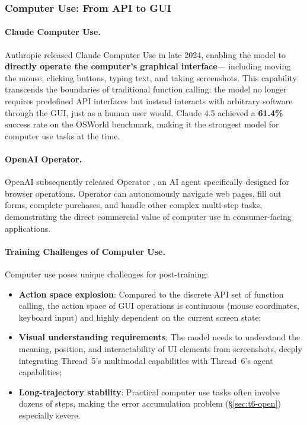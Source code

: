 \subsubsection{Computer Use: From API to GUI}

\paragraph{Claude Computer Use.}
Anthropic released Claude Computer Use \cite{anthropic2024computeruse} in late 2024,
enabling the model to \textbf{directly operate the computer's graphical interface}---
including moving the mouse, clicking buttons, typing text, and taking screenshots.
This capability transcends the boundaries of traditional function calling:
the model no longer requires predefined API interfaces
but instead interacts with arbitrary software through the GUI, just as a human user would.
Claude 4.5 \cite{anthropic2025claude45} achieved a \textbf{61.4\%} success rate on the OSWorld benchmark,
making it the strongest model for computer use tasks at the time.

\paragraph{OpenAI Operator.}
OpenAI subsequently released Operator \cite{openai2025operator},
an AI agent specifically designed for browser operations.
Operator can autonomously navigate web pages, fill out forms, complete purchases, and handle other complex multi-step tasks,
demonstrating the direct commercial value of computer use in consumer-facing applications.

\paragraph{Training Challenges of Computer Use.}
Computer use poses unique challenges for post-training:
\begin{itemize}[leftmargin=2em]
  \item \textbf{Action space explosion}: Compared to the discrete API set of function calling,
    the action space of GUI operations is continuous (mouse coordinates, keyboard input)
    and highly dependent on the current screen state;
  \item \textbf{Visual understanding requirements}: The model needs to understand the meaning, position, and interactability of UI elements from screenshots,
    deeply integrating Thread~5's multimodal capabilities with Thread~6's agent capabilities;
  \item \textbf{Long-trajectory stability}: Practical computer use tasks often involve dozens of steps,
    making the error accumulation problem (\S\ref{sec:t6-open}) especially severe.
\end{itemize}

